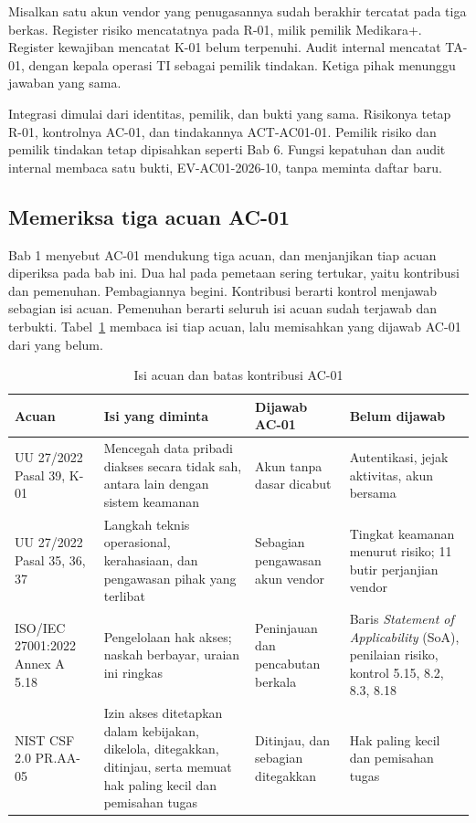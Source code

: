 \begin{kasus}[title={Kasus Medikara Health: Satu Masalah Akses, Tiga Catatan}]
Misalkan satu akun vendor yang penugasannya sudah berakhir tercatat pada tiga berkas. Register
risiko mencatatnya pada R-01, milik pemilik Medikara+. Register kewajiban mencatat K-01 belum
terpenuhi. Audit internal mencatat TA-01, dengan kepala operasi TI sebagai pemilik tindakan.
Ketiga pihak menunggu jawaban yang sama.

Integrasi dimulai dari identitas, pemilik, dan bukti yang sama. Risikonya tetap R-01, kontrolnya
AC-01, dan tindakannya ACT-AC01-01. Pemilik risiko dan pemilik tindakan tetap dipisahkan seperti
Bab 6. Fungsi kepatuhan dan audit internal membaca satu bukti, EV-AC01-2026-10, tanpa meminta
daftar baru.
\end{kasus}

\subsection*{Memeriksa tiga acuan AC-01}

Bab 1 menyebut AC-01 mendukung tiga acuan, dan menjanjikan tiap acuan diperiksa pada bab ini. Dua
hal pada pemetaan sering tertukar, yaitu kontribusi dan pemenuhan. Pembagiannya begini. Kontribusi
berarti kontrol menjawab sebagian isi acuan. Pemenuhan berarti seluruh isi acuan sudah terjawab
dan terbukti. Tabel~\ref{tab:ch14-tiga-acuan} membaca isi tiap acuan, lalu memisahkan yang dijawab
AC-01 dari yang belum.

\begin{table}[!htb]
  \centering\small
  \caption{Isi acuan dan batas kontribusi AC-01}\label{tab:ch14-tiga-acuan}
  \begin{tabularx}{\textwidth}{|>{\raggedright\arraybackslash}p{}|>{\raggedright\arraybackslash}X|>{\raggedright\arraybackslash}p{}|>{\raggedright\arraybackslash}p{}|}
    \hline
    \textbf{Acuan} & \textbf{Isi yang diminta} & \textbf{Dijawab AC-01} & \textbf{Belum dijawab} \\
    \hline
    UU 27/2022 Pasal 39, K-01 & Mencegah data pribadi diakses secara tidak sah, antara lain dengan
    sistem keamanan & Akun tanpa dasar dicabut & Autentikasi, jejak aktivitas, akun bersama \\
    \hline
    UU 27/2022 Pasal 35, 36, 37 & Langkah teknis operasional, kerahasiaan, dan pengawasan pihak
    yang terlibat & Sebagian pengawasan akun vendor & Tingkat keamanan menurut risiko; 11 butir
    perjanjian vendor \\ \hline
    ISO/IEC 27001:2022 Annex A 5.18 & Pengelolaan hak akses; naskah berbayar, uraian ini ringkas &
    Peninjauan dan pencabutan berkala & Baris \textit{Statement of Applicability} (SoA), penilaian
    risiko, kontrol 5.15, 8.2, 8.3, 8.18 \\ \hline
    NIST CSF 2.0 PR.AA-05 & Izin akses ditetapkan dalam kebijakan, dikelola, ditegakkan, ditinjau,
    serta memuat hak paling kecil dan pemisahan tugas & Ditinjau, dan sebagian ditegakkan & Hak
    paling kecil dan pemisahan tugas \\ \hline
  \end{tabularx}
\end{table}

